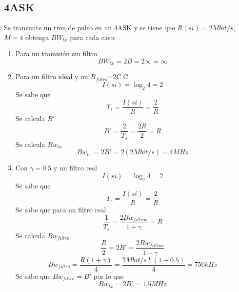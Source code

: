 \documentclass[10pt]{article}
\begin{document}
\subsection{4ASK}
Se transmite un tren de pulso en un 4ASK y se tiene que $R(si)=2Mbit/s$, $M=4$ obtenga $BW_{tx}$ para cada caso:
\begin{enumerate}
	\item Para un tramisión sin filtro
	\begin{equation}
		BW_{tx}=2B=2\infty=\infty
	\end{equation}

		\item Para un filtro ideal y un $B_{filtro}$=2C.C
		\begin{equation}
		I(si)=\log_{2}{4}=2
		\end{equation}
		Se sabe que
		\begin{equation}
			T_s=\frac{I(si)}{R}=\frac{2}{R}
		\end{equation}
		Se calcula $B'$
		\begin{equation}
			B'=\frac{2}{T_s}=\frac{2R}{2}=R
		\end{equation}
		Se calcula $Bw_{tx}$
		\begin{equation}
			Bw_{tx}=2B'=2(2Mbit/s)=4MHz
		\end{equation}
		\item Con $\gamma=0.5$ y un filtro real
			\begin{equation}
			I(si)=\log_{2}{4}=2
		\end{equation}
		Se sabe que
		\begin{equation}
			T_s=\frac{I(si)}{R}=\frac{2}{R}
		\end{equation}
		Se sabe que para un filtro real
		\begin{equation}
			\frac{1}{T_s}=\frac{2Bw_{filtroo}}{1+\gamma}=R
		\end{equation}
		Se calcula $Bw_{filtro}$
		\begin{equation}
		\frac{R}{2}=2B'=\frac{2Bw_{filtroo}}{1+\gamma}
		\end{equation}
		\begin{equation}
			Bw_{filtro}=\frac{R(1+\gamma)}{4}=\frac{2Mbit/s*(1+0.5)}{4}=750kHz
		\end{equation}
		Se sabe que $Bw_{filtro}=B'$ por lo que
		\begin{equation}
			Bw_{tx}=2B'=1.5MHz
		\end{equation}
\end{enumerate}
\end{document}
